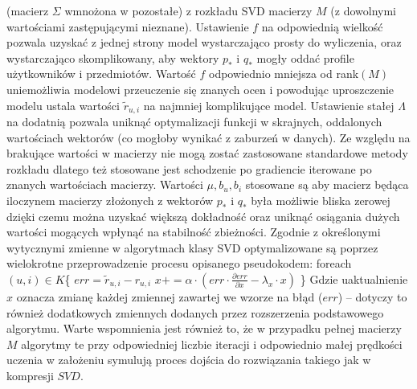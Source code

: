 \documentclass{pracamgr}
\begin{document}
     (macierz $\Sigma$ wmnożona w pozostałe) z rozkładu SVD macierzy $M$ (z dowolnymi wartościami zastępującymi nieznane).
     Ustawienie $f$ na odpowiednią wielkość pozwala uzyskać z jednej strony model wystarczająco prosty do wyliczenia,
     oraz wystarczająco skomplikowany, aby wektory $p_*$ i $q_*$ mogły oddać profile użytkowników i przedmiotów.
     Wartość $f$ odpowiednio mniejsza od rank$(M)$ uniemożliwia modelowi przeuczenie się znanych ocen i powodując uproszczenie modelu
     ustala wartości $\tilde{r}_{u,i}$ na najmniej komplikujące model.
     Ustawienie stałej $\Lambda$ na dodatnią pozwala uniknąć optymalizacji funkcji w skrajnych, oddalonych wartościach wektorów
     (co mogłoby wynikać z zaburzeń w danych).\newline
     Ze względu na brakujące wartości w macierzy nie mogą zostać zastosowane standardowe metody rozkładu dlatego też stosowane jest
     schodzenie po gradiencie iterowane po znanych wartościach macierzy.
     Wartości $\mu,b_u,b_i$ stosowane są aby macierz będąca iloczynem macierzy złożonych z wektorów $p_*$ i $q_*$ była możliwie bliska zerowej
     dzięki czemu można uzyskać większą dokładność oraz uniknąć osiągania dużych wartości mogących wpłynąć na stabilność zbieżności.\newline
     Zgodnie z określonymi wytycznymi zmienne w algorytmach klasy SVD optymalizowane są
     poprzez wielokrotne przeprowadzenie procesu opisanego pseudokodem:\newline\newline
     \hspace*{16pt}	foreach $(u,i)\in K$\{\newline
     \hspace*{32pt}		$err=\tilde{r}_{u,i}-r_{u,i}$\newline
     \hspace*{32pt}		$x+=\alpha\cdot(err\cdot\frac{\partial err}{\partial x}-\lambda_{x}\cdot x)$\newline
     \hspace*{16pt}	\}\newline    
     Gdzie uaktualnienie $x$ oznacza zmianę każdej zmiennej zawartej we wzorze na błąd ($err$) -- dotyczy to również dodatkowych zmiennych dodanych
     przez rozszerzenia podstawowego algorytmu.\newline
     Warte wspomnienia jest również to, że w przypadku pełnej macierzy $M$ algorytmy te przy odpowiedniej liczbie iteracji i odpowiednio małej
     prędkości uczenia w założeniu symulują proces dojścia do rozwiązania takiego jak w kompresji $SVD$.
\end{document}
